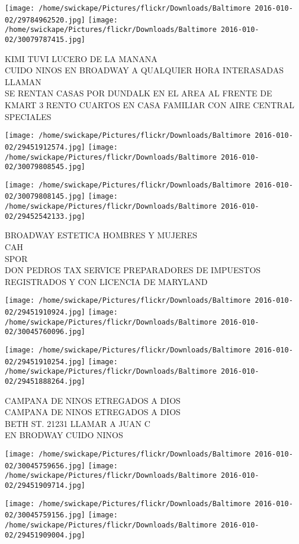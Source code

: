 \documentclass[10pt,letterpaper]{article}
\begin{document}
\texttt{[image: /home/swickape/Pictures/flickr/Downloads/Baltimore 2016-010-02/29784962520.jpg]}
\texttt{[image: /home/swickape/Pictures/flickr/Downloads/Baltimore 2016-010-02/30079787415.jpg]}

KIMI TUVI LUCERO DE LA MANANA\\
CUIDO NINOS EN BROADWAY A QUALQUIER HORA INTERASADAS LLAMAN\\
SE RENTAN CASAS POR DUNDALK EN EL AREA AL FRENTE DE KMART 3 RENTO CUARTOS EN CASA FAMILIAR CON AIRE CENTRAL\\
SPECIALES
\pagebreak

\texttt{[image: /home/swickape/Pictures/flickr/Downloads/Baltimore 2016-010-02/29451912574.jpg]}
\texttt{[image: /home/swickape/Pictures/flickr/Downloads/Baltimore 2016-010-02/30079808545.jpg]}

\texttt{[image: /home/swickape/Pictures/flickr/Downloads/Baltimore 2016-010-02/30079808145.jpg]}
\texttt{[image: /home/swickape/Pictures/flickr/Downloads/Baltimore 2016-010-02/29452542133.jpg]}

BROADWAY ESTETICA HOMBRES Y MUJERES\\
CAH\\
SPOR\\
DON PEDROS TAX SERVICE PREPARADORES DE IMPUESTOS REGISTRADOS Y CON LICENCIA DE MARYLAND
\pagebreak

\texttt{[image: /home/swickape/Pictures/flickr/Downloads/Baltimore 2016-010-02/29451910924.jpg]}
\texttt{[image: /home/swickape/Pictures/flickr/Downloads/Baltimore 2016-010-02/30045760096.jpg]}

\texttt{[image: /home/swickape/Pictures/flickr/Downloads/Baltimore 2016-010-02/29451910254.jpg]}
\texttt{[image: /home/swickape/Pictures/flickr/Downloads/Baltimore 2016-010-02/29451888264.jpg]}

CAMPANA DE NINOS ETREGADOS A DIOS\\
CAMPANA DE NINOS ETREGADOS A DIOS\\
BETH ST. 21231 LLAMAR A JUAN C\\
EN BRODWAY CUIDO NINOS
\pagebreak

\texttt{[image: /home/swickape/Pictures/flickr/Downloads/Baltimore 2016-010-02/30045759656.jpg]}
\texttt{[image: /home/swickape/Pictures/flickr/Downloads/Baltimore 2016-010-02/29451909714.jpg]}

\texttt{[image: /home/swickape/Pictures/flickr/Downloads/Baltimore 2016-010-02/30045759156.jpg]}
\texttt{[image: /home/swickape/Pictures/flickr/Downloads/Baltimore 2016-010-02/29451909004.jpg]}
\end{document}
